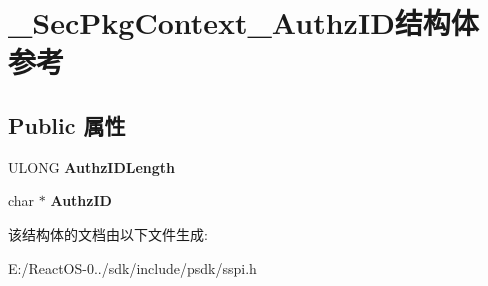 \hypertarget{struct___sec_pkg_context___authz_i_d}{}\section{\+\_\+\+Sec\+Pkg\+Context\+\_\+\+Authz\+I\+D结构体 参考}
\label{struct___sec_pkg_context___authz_i_d}
\subsection*{Public 属性}
\begin{DoxyCompactItemize}
\item 
\mbox{\label{struct___sec_pkg_context___authz_i_d_adbe37161f7f674a45cb8f871e7ed81f6}} 
U\+L\+O\+NG {\bfseries Authz\+I\+D\+Length}
\item 
\mbox{\label{struct___sec_pkg_context___authz_i_d_aae54816a49fc5f7c45881c7090e93bc3}} 
char $\ast$ {\bfseries Authz\+ID}
\end{DoxyCompactItemize}


该结构体的文档由以下文件生成\+:\begin{DoxyCompactItemize}
\item 
E\+:/\+React\+O\+S-\/0../sdk/include/psdk/sspi.\+h\end{DoxyCompactItemize}
